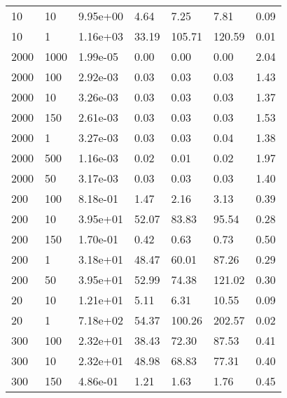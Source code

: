 \begin{table}
\begin{tabular}{lllllll}
10        &   10        &   9.95e+00  &   4.64      &   7.25      &   7.81      &   0.09      \\ 
10        &   1         &   1.16e+03  &   33.19     &   105.71    &   120.59    &   0.01      \\ 
2000      &   1000      &   1.99e-05  &   0.00      &   0.00      &   0.00      &   2.04      \\ 
2000      &   100       &   2.92e-03  &   0.03      &   0.03      &   0.03      &   1.43      \\ 
2000      &   10        &   3.26e-03  &   0.03      &   0.03      &   0.03      &   1.37      \\ 
2000      &   150       &   2.61e-03  &   0.03      &   0.03      &   0.03      &   1.53      \\ 
2000      &   1         &   3.27e-03  &   0.03      &   0.03      &   0.04      &   1.38      \\ 
2000      &   500       &   1.16e-03  &   0.02      &   0.01      &   0.02      &   1.97      \\ 
2000      &   50        &   3.17e-03  &   0.03      &   0.03      &   0.03      &   1.40      \\ 
200       &   100       &   8.18e-01  &   1.47      &   2.16      &   3.13      &   0.39      \\ 
200       &   10        &   3.95e+01  &   52.07     &   83.83     &   95.54     &   0.28      \\ 
200       &   150       &   1.70e-01  &   0.42      &   0.63      &   0.73      &   0.50      \\ 
200       &   1         &   3.18e+01  &   48.47     &   60.01     &   87.26     &   0.29      \\ 
200       &   50        &   3.95e+01  &   52.99     &   74.38     &   121.02    &   0.30      \\ 
20        &   10        &   1.21e+01  &   5.11      &   6.31      &   10.55     &   0.09      \\ 
20        &   1         &   7.18e+02  &   54.37     &   100.26    &   202.57    &   0.02      \\ 
300       &   100       &   2.32e+01  &   38.43     &   72.30     &   87.53     &   0.41      \\ 
300       &   10        &   2.32e+01  &   48.98     &   68.83     &   77.31     &   0.40      \\ 
300       &   150       &   4.86e-01  &   1.21      &   1.63      &   1.76      &   0.45      \\ 

\end{tabular}
\end{table}
